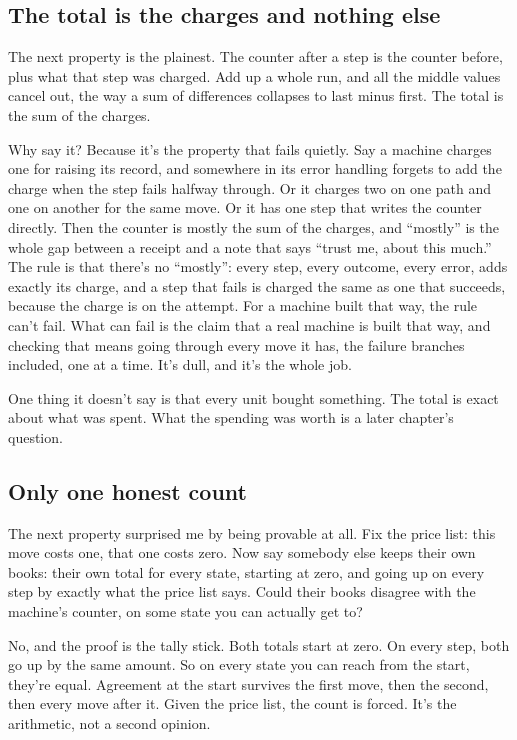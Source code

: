 \documentclass[11pt,twoside]{article}
\theoremstyle{thielethm}
\theoremstyle{thieledef}
\theoremstyle{thieledef}
\theoremstyle{thieledef}
\theoremstyle{thielethm}
\theoremstyle{thieleobs}
\theoremstyle{thielethm}
\begin{document}
\subsection{The total is the charges and nothing else}

The next property is the plainest. The counter after a step is the counter before, plus what that step was charged. Add up a whole run, and all the middle values cancel out, the way a sum of differences collapses to last minus first. The total is the sum of the charges.

Why say it? Because it's the property that fails quietly. Say a machine charges one for raising its record, and somewhere in its error handling forgets to add the charge when the step fails halfway through. Or it charges two on one path and one on another for the same move. Or it has one step that writes the counter directly. Then the counter is mostly the sum of the charges, and ``mostly'' is the whole gap between a receipt and a note that says ``trust me, about this much.'' The rule is that there's no ``mostly'': every step, every outcome, every error, adds exactly its charge, and a step that fails is charged the same as one that succeeds, because the charge is on the attempt. For a machine built that way, the rule can't fail. What can fail is the claim that a real machine is built that way, and checking that means going through every move it has, the failure branches included, one at a time. It's dull, and it's the whole job.

One thing it doesn't say is that every unit bought something. The total is exact about what was spent. What the spending was worth is a later chapter's question.

\subsection{Only one honest count}

The next property surprised me by being provable at all. Fix the price list: this move costs one, that one costs zero. Now say somebody else keeps their own books: their own total for every state, starting at zero, and going up on every step by exactly what the price list says. Could their books disagree with the machine's counter, on some state you can actually get to?

No, and the proof is the tally stick. Both totals start at zero. On every step, both go up by the same amount. So on every state you can reach from the start, they're equal. Agreement at the start survives the first move, then the second, then every move after it. Given the price list, the count is forced. It's the arithmetic, not a second opinion.
\end{document}
